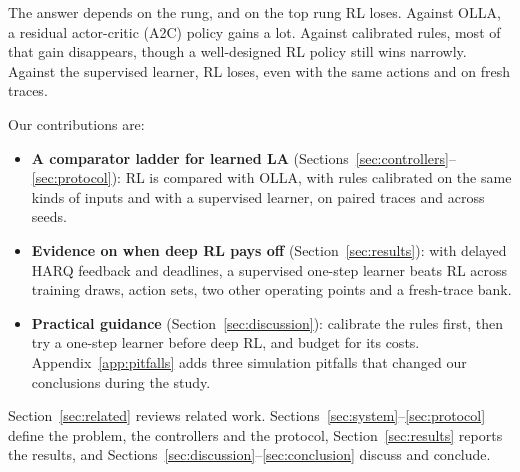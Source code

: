 The answer depends on the rung, and on the top rung RL loses. Against OLLA, a residual actor-critic (A2C) policy gains a lot. Against calibrated rules, most of that gain disappears, though a well-designed RL policy still wins narrowly. Against the supervised learner, RL loses, even with the same actions and on fresh traces.

Our contributions are:
\begin{itemize}
\item \textbf{A comparator ladder for learned LA} (Sections~\ref{sec:controllers}--\ref{sec:protocol}): RL is compared with OLLA, with rules calibrated on the same kinds of inputs and with a supervised learner, on paired traces and across seeds.
\item \textbf{Evidence on when deep RL pays off} (Section~\ref{sec:results}): with delayed HARQ feedback and deadlines, a supervised one-step learner beats RL across training draws, action sets, two other operating points and a fresh-trace bank.
\item \textbf{Practical guidance} (Section~\ref{sec:discussion}): calibrate the rules first, then try a one-step learner before deep RL, and budget for its costs. Appendix~\ref{app:pitfalls} adds three simulation pitfalls that changed our conclusions during the study.
\end{itemize}
Section~\ref{sec:related} reviews related work. Sections~\ref{sec:system}--\ref{sec:protocol} define the problem, the controllers and the protocol, Section~\ref{sec:results} reports the results, and Sections~\ref{sec:discussion}--\ref{sec:conclusion} discuss and conclude.
